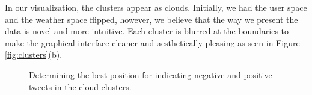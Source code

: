 \documentclass[journal]{vgtc}                %
\begin{document}
In our visualization, the clusters appear as clouds. Initially, we had the user space and the weather space flipped, however, we believe that the way we present the data is novel and more intuitive. Each cluster is blurred at the boundaries to make the graphical interface cleaner and aesthetically pleasing as seen in Figure \ref{fig:clusters}(b).




\begin{figure}[htp]
  \centering
  \quad
  \quad
\caption{Determining the best position for indicating negative and positive tweets in the cloud clusters.}
\label{fig:corners}
\end{figure}
\end{document}
